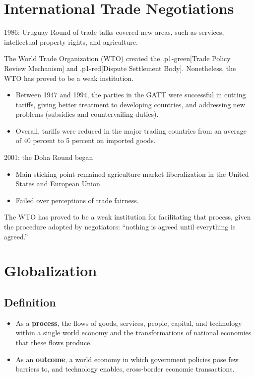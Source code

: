 \documentclass[
]{book}
\begin{document}
\hypertarget{international-trade-negotiations}{%
\section{International Trade Negotiations}\label{international-trade-negotiations}}

1986: Uruguay Round of trade talks covered new areas, such as services, intellectual property rights, and agriculture.

The World Trade Organization (WTO) created the .p1-green{[}Trade Policy Review Mechanism{]} and .p1-red{[}Dispute Settlement Body{]}. Nonetheless, the WTO has proved to be a weak institution.

\begin{itemize}
\item
  Between 1947 and 1994, the parties in the GATT were successful in cutting tariffs, giving better treatment to developing countries, and addressing new problems (subsidies and countervailing duties).
\item
  Overall, tariffs were reduced in the major trading countries from an average of 40 percent to 5 percent on imported goods.
\end{itemize}

2001: the Doha Round began

\begin{itemize}
\item
  Main sticking point remained agriculture market liberalization in the United States and European Union
\item
  Failed over perceptions of trade fairness.
\end{itemize}

The WTO has proved to be a weak institution for facilitating that process, given the procedure adopted by negotiators: ``nothing is agreed until everything is agreed.''

\hypertarget{globalization}{%
\section{Globalization}\label{globalization}}

\hypertarget{definition}{%
\subsection{Definition}\label{definition}}

\begin{itemize}
\item
  As a \textbf{process}, the flows of goods, services, people, capital, and technology within a single world economy and the
  transformations of national economies that these flows produce.
\item
  As an \textbf{outcome}, a world economy in which government policies pose few barriers to, and technology enables, cross-border economic transactions.
\end{itemize}
\end{document}
